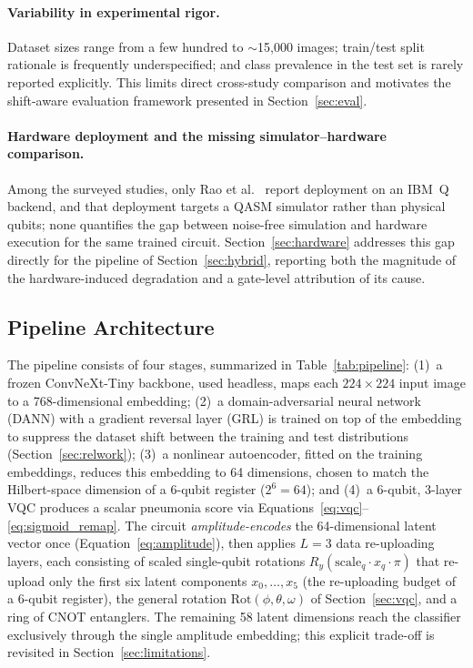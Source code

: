 \documentclass[11pt,a4paper]{article}
\begin{document}
\paragraph{Variability in experimental rigor.}
Dataset sizes range from a few hundred to $\sim$15,000 images; train/test
split rationale is frequently underspecified; and class prevalence in the
test set is rarely reported explicitly.  This limits direct cross-study
comparison and motivates the shift-aware evaluation framework presented in
Section~\ref{sec:eval}.

\paragraph{Hardware deployment and the missing simulator--hardware comparison.}
Among the surveyed studies, only Rao et al.~\cite{rao2024} report deployment on
an IBM~Q backend, and that deployment targets a QASM simulator rather than
physical qubits; none quantifies the gap between noise-free simulation and
hardware execution for the same trained circuit.  Section~\ref{sec:hardware}
addresses this gap directly for the pipeline of Section~\ref{sec:hybrid},
reporting both the magnitude of the hardware-induced degradation and a
gate-level attribution of its cause.

\subsection{Pipeline Architecture}

The pipeline consists of four stages, summarized in
Table~\ref{tab:pipeline}: (1)~a frozen ConvNeXt-Tiny backbone, used headless,
maps each $224\times224$ input image to a 768-dimensional embedding; (2)~a
domain-adversarial neural network (DANN) with a gradient reversal layer (GRL)
is trained on top of the embedding to suppress the dataset shift between the
training and test distributions (Section~\ref{sec:relwork}); (3)~a
nonlinear autoencoder, fitted on the training embeddings, reduces this
embedding to 64 dimensions, chosen to match the Hilbert-space dimension of a
6-qubit register ($2^6 = 64$); and (4)~a
6-qubit, 3-layer VQC produces a scalar pneumonia score via
Equations~\ref{eq:vqc}--\ref{eq:sigmoid_remap}.  The circuit
\emph{amplitude-encodes} the 64-dimensional latent vector once
(Equation~\ref{eq:amplitude}), then applies $L=3$ data re-uploading
layers, each consisting of scaled single-qubit rotations
$R_y(\mathrm{scale}_q \cdot x_q \cdot \pi)$ that re-upload only the first
six latent components $x_0,\dots,x_5$ (the re-uploading budget of a
6-qubit register), the general rotation
$\mathrm{Rot}(\phi,\theta,\omega)$ of Section~\ref{sec:vqc}, and a ring of
CNOT entanglers.  The remaining 58 latent dimensions reach the classifier
exclusively through the single amplitude embedding; this explicit trade-off
is revisited in Section~\ref{sec:limitations}.
\end{document}
